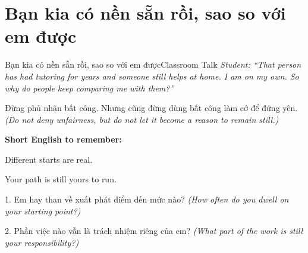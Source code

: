 \section{Bạn kia có nền sẵn rồi, sao so với em được}
\begin{truyen}{Bạn kia có nền sẵn rồi, sao so với em được}{Classroom Talk}
\textit{Student: ``That person has had tutoring for years and someone still helps at home. I am on my own. So why do people keep comparing me with them?''}\\[4pt]



\end{truyen}

\begin{baihoc}
Đừng phủ nhận bất công. Nhưng cũng đừng dùng bất công làm cớ để đứng yên.
\textit{(Do not deny unfairness, but do not let it become a reason to remain still.)}
\end{baihoc}

\begin{ghinhoanh}
\textbf{Short English to remember:}

Different starts are real.

Your path is still yours to run.
\end{ghinhoanh}

\begin{tuhocnhanh}
1. Em hay than về xuất phát điểm đến mức nào? \textit{(How often do you dwell on your starting point?)}

2. Phần việc nào vẫn là trách nhiệm riêng của em? \textit{(What part of the work is still your responsibility?)}
\end{tuhocnhanh}
\ngancach

